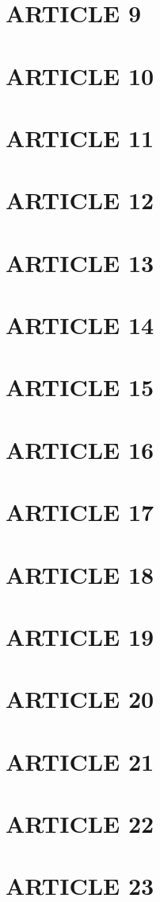 \documentclass[a4paper, 11pt]{article}
\begin{document}
\section*{ARTICLE 9}
\section*{ARTICLE 10}
\section*{ARTICLE 11}
\section*{ARTICLE 12}
\section*{ARTICLE 13}
\section*{ARTICLE 14}
\section*{ARTICLE 15}
\section*{ARTICLE 16}
\section*{ARTICLE 17}
\section*{ARTICLE 18}
\section*{ARTICLE 19}
\section*{ARTICLE 20}
\section*{ARTICLE 21}
\section*{ARTICLE 22}
\section*{ARTICLE 23}
\end{document}
